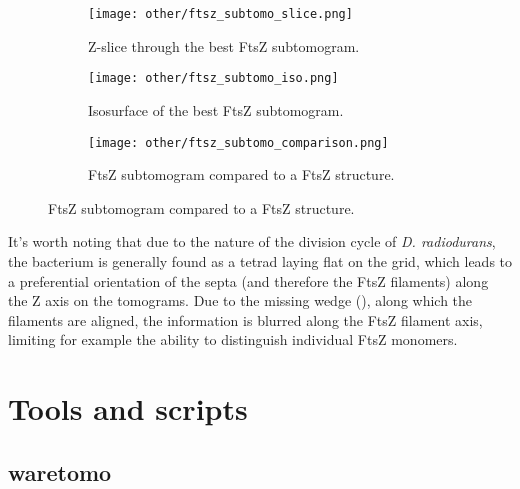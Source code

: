 \begin{figure}[ht]
    \centering
    \begin{subfigure}[B]{.32\textwidth}
        \centering
        \texttt{[image: other/ftsz\_subtomo\_slice.png]}
        \caption{Z-slice through the best FtsZ subtomogram.}
        \label{fig:ftsz_subtomo_slice}
    \end{subfigure}%
    \hfill
    \begin{subfigure}[B]{.32\textwidth}
        \centering
        \texttt{[image: other/ftsz\_subtomo\_iso.png]}
        \caption{Isosurface of the best FtsZ subtomogram.}
        \label{fig:ftsz_subtomo_iso}
    \end{subfigure}%
    \hfill
    \begin{subfigure}[B]{.32\textwidth}
        \centering
        \texttt{[image: other/ftsz\_subtomo\_comparison.png]}
        \caption{FtsZ subtomogram compared to a FtsZ structure.}
        \label{fig:ftsz_subtomo_iso_struct}
    \end{subfigure}%
    \label{fig:ftsz_subtomo}
\end{figure}

It's worth noting that due to the nature of the division cycle of \textit{D. radiodurans}, the bacterium is generally found as a tetrad laying flat on the grid, which leads to a preferential orientation of the septa (and therefore the FtsZ filaments) along the Z axis on the tomograms.
Due to the missing wedge (), along which the filaments are aligned, the information is blurred along the FtsZ filament axis, limiting for example the ability to distinguish individual FtsZ monomers.


\section{Tools and scripts}

\subsection{waretomo}\label{waretomo}

